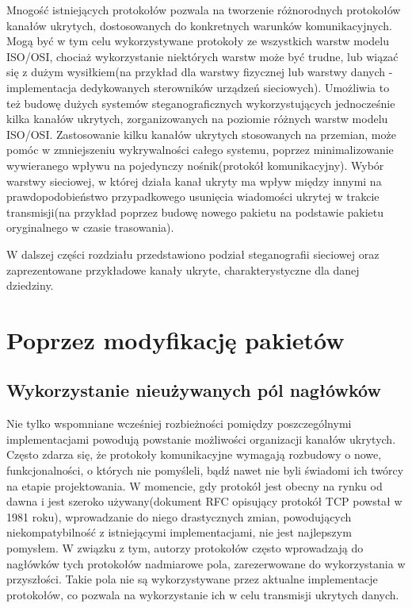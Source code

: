 \documentclass[a4paper, twoside, 12pt]{report}
\begin{document}
    Mnogość istniejących protokołów pozwala na tworzenie różnorodnych protokołów
    kanałów ukrytych, dostosowanych do konkretnych warunków komunikacyjnych.
    Mogą być w tym celu wykorzystywane protokoły ze wszystkich warstw modelu
    ISO/OSI, chociaż wykorzystanie niektórych warstw może być trudne, lub wiązać
    się z dużym wysiłkiem(na przykład dla warstwy fizycznej lub warstwy danych -
    implementacja dedykowanych sterowników urządzeń sieciowych). Umożliwia to
    też budowę dużych systemów steganograficznych wykorzystujących jednocześnie
    kilka kanałów ukrytych, zorganizowanych na poziomie różnych warstw modelu ISO/OSI.
    Zastosowanie kilku kanałów ukrytych stosowanych na przemian, może pomóc w zmniejszeniu
    wykrywalności całego systemu, poprzez minimalizowanie wywieranego wpływu na pojedynczy
    nośnik(protokół komunikacyjny). Wybór warstwy sieciowej, w której działa kanał ukryty
    ma wpływ między innymi na prawdopodobieństwo przypadkowego usunięcia wiadomości
    ukrytej w trakcie transmisji(na przykład poprzez budowę nowego pakietu na podstawie
    pakietu oryginalnego w czasie trasowania).

    W dalszej części rozdziału przedstawiono podział steganografii sieciowej
    oraz zaprezentowane przykładowe kanały ukryte, charakterystyczne dla danej
    dziedziny.
    \section{Poprzez modyfikację pakietów} \label{MODYFIKACJAPAKIETOW}
        \subsection{Wykorzystanie nieużywanych pól nagłówków}
        Nie tylko wspomniane wcześniej rozbieżności pomiędzy poszczególnymi
        implementacjami powodują powstanie możliwości organizacji kanałów ukrytych.
        Często zdarza się, że protokoły komunikacyjne wymagają rozbudowy o nowe,
        funkcjonalności, o których nie pomyśleli, bądź nawet nie byli świadomi
        ich twórcy na etapie projektowania. W momencie, gdy protokół jest obecny
        na rynku od dawna i jest szeroko używany(dokument RFC opisujący protokół TCP
        powstał w 1981 roku\cite{TCPRFC}), wprowadzanie do niego drastycznych zmian,
        powodujących niekompatybilność z istniejącymi implementacjami, nie jest
        najlepszym pomysłem. W związku z tym, autorzy protokołów często wprowadzają
        do nagłówków tych protokołów nadmiarowe pola, zarezerwowane do wykorzystania
        w przyszłości. Takie pola nie są wykorzystywane przez aktualne implementacje
        protokołów, co pozwala na wykorzystanie ich w celu transmisji ukrytych danych.
\end{document}

